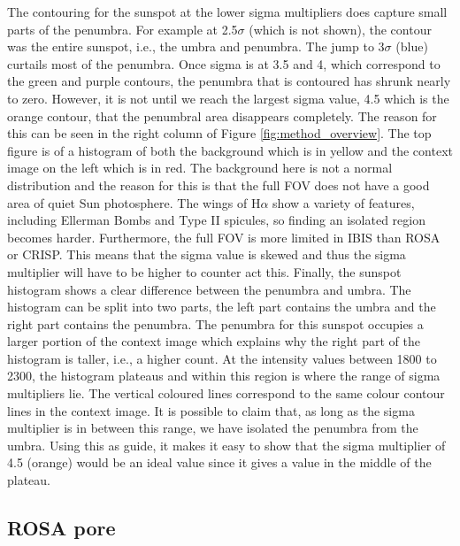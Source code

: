     The contouring for the sunspot at the lower sigma multipliers does capture small parts of the penumbra.
    For example at 2.5$\sigma$ (which is not shown), the contour was the entire sunspot, i.e., the umbra and penumbra.
    The jump to 3$\sigma$ (blue) curtails most of the penumbra.
    Once sigma is at 3.5 and 4, which correspond to the green and purple contours, the penumbra that is contoured has shrunk nearly to zero.
    However, it is not until we reach the largest sigma value, 4.5 which is the orange contour, that the penumbral area disappears completely.
    The reason for this can be seen in the right column of Figure \ref{fig:method_overview}.
    The top figure is of a histogram of both the background which is in yellow and the context image on the left which is in red.
    The background here is not a normal distribution and the reason for this is that the full FOV does not have a good area of quiet Sun photosphere.
    The wings of H$\alpha$ show a variety of features, including Ellerman Bombs and Type II spicules, so finding an isolated region becomes harder.
    Furthermore, the full FOV is more limited in IBIS than ROSA or CRISP. 
    This means that the sigma value is skewed and thus the sigma multiplier will have to be higher to counter act this.
    Finally, the sunspot histogram shows a clear difference between the penumbra and umbra.
    The histogram can be split into two parts, the left part contains the umbra and the right part contains the penumbra.
    The penumbra for this sunspot occupies a larger portion of the context image which explains why the right part of the histogram is taller, i.e., a higher count.
    At the intensity values between 1800 to 2300, the histogram plateaus and within this region is where the range of sigma multipliers lie. 
    The vertical coloured lines correspond to the same colour contour lines in the context image.
    It is possible to claim that, as long as the sigma multiplier is in between this range, we have isolated the penumbra from the umbra.
    Using this as guide, it makes it easy to show that the sigma multiplier of 4.5 (orange) would be an ideal value since it gives a value in the middle of the plateau.
    
    \subsection{ROSA pore}
        
